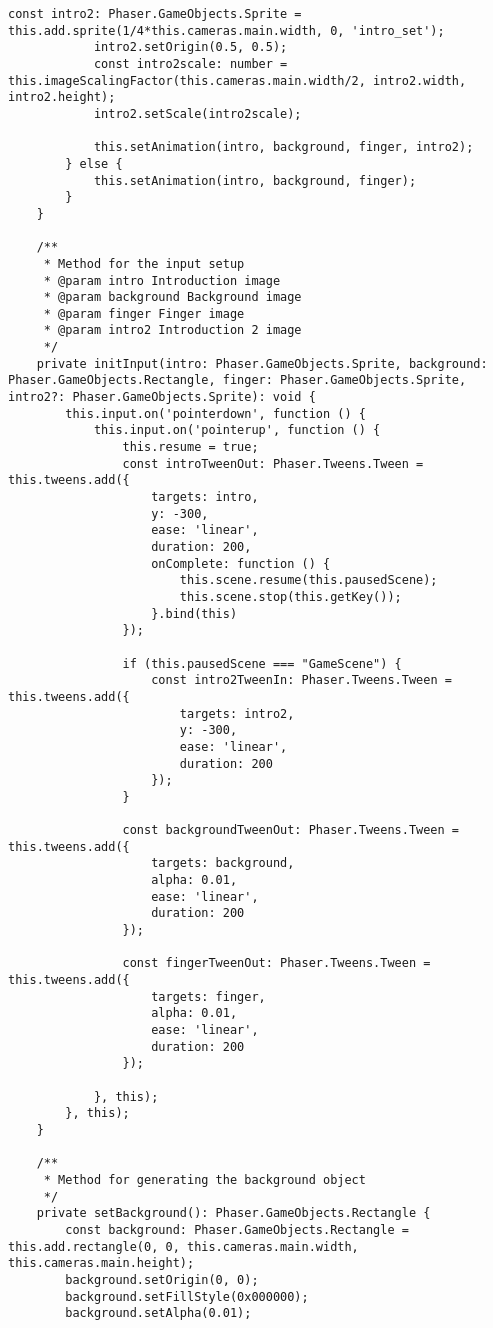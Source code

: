 \begin{lstlisting}[style=TypeScript, caption={introScene.ts}]
            const intro2: Phaser.GameObjects.Sprite = this.add.sprite(1/4*this.cameras.main.width, 0, 'intro_set');
            intro2.setOrigin(0.5, 0.5);
            const intro2scale: number = this.imageScalingFactor(this.cameras.main.width/2, intro2.width, intro2.height);
            intro2.setScale(intro2scale);

            this.setAnimation(intro, background, finger, intro2);
        } else {
            this.setAnimation(intro, background, finger);
        }
    }

    /**
     * Method for the input setup
     * @param intro Introduction image
     * @param background Background image
     * @param finger Finger image
     * @param intro2 Introduction 2 image
     */
    private initInput(intro: Phaser.GameObjects.Sprite, background: Phaser.GameObjects.Rectangle, finger: Phaser.GameObjects.Sprite, intro2?: Phaser.GameObjects.Sprite): void {
        this.input.on('pointerdown', function () {
            this.input.on('pointerup', function () {
                this.resume = true;
                const introTweenOut: Phaser.Tweens.Tween = this.tweens.add({
                    targets: intro,
                    y: -300,
                    ease: 'linear',
                    duration: 200,
                    onComplete: function () {
                        this.scene.resume(this.pausedScene);
                        this.scene.stop(this.getKey());
                    }.bind(this)
                });

                if (this.pausedScene === "GameScene") {
                    const intro2TweenIn: Phaser.Tweens.Tween = this.tweens.add({
                        targets: intro2,
                        y: -300,
                        ease: 'linear',
                        duration: 200
                    });
                }

                const backgroundTweenOut: Phaser.Tweens.Tween = this.tweens.add({
                    targets: background,
                    alpha: 0.01,
                    ease: 'linear',
                    duration: 200
                });

                const fingerTweenOut: Phaser.Tweens.Tween = this.tweens.add({
                    targets: finger,
                    alpha: 0.01,
                    ease: 'linear',
                    duration: 200
                });

            }, this);
        }, this);
    }

    /**
     * Method for generating the background object
     */
    private setBackground(): Phaser.GameObjects.Rectangle {
        const background: Phaser.GameObjects.Rectangle = this.add.rectangle(0, 0, this.cameras.main.width, this.cameras.main.height);
        background.setOrigin(0, 0);
        background.setFillStyle(0x000000);
        background.setAlpha(0.01);


\end{lstlisting}
